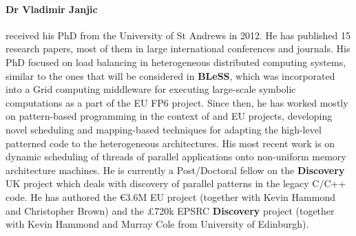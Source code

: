 \documentclass[a4paper,11pt]{article}
\newcommand{\project}[1]{\textbf{#1}\xspace}
\newcommand{\BLESS}{\project{BLeSS}}
\newcommand{\TheProject}{\BLESS}
\begin{document}
\paragraph{Dr Vladimir Janjic}
received his PhD from the University of St Andrews in 2012.
He has published 15 research papers, most of them in large international
conferences and journals. His PhD focused on load balancing in heterogeneous distributed computing systems, similar to the ones that will be considered in \TheProject{}, which was incorporated into a Grid computing middleware for executing large-scale symbolic computations as a part of the \science EU FP6 project. Since then, he has worked mostly on pattern-based
programming in the context of \paraphrase{} and \rephrase{} EU projects, 
developing novel scheduling and mapping-based techniques for adapting the high-level patterned code to the heterogeneous architectures. His most recent work is on dynamic scheduling of threads of parallel applications onto non-uniform memory architecture machines. He is currently a Post\-/Doctoral fellow on the \textbf{Discovery} UK project which deals with discovery of parallel patterns in the legacy C/C++ code. He has authored the \euro 3.6M \rephrase EU project (together with Kevin Hammond and Christopher Brown) and the £720k EPSRC \textbf{Discovery} project (together with Kevin Hammond and Murray Cole from University of Edinburgh).


{}
\end{document}

